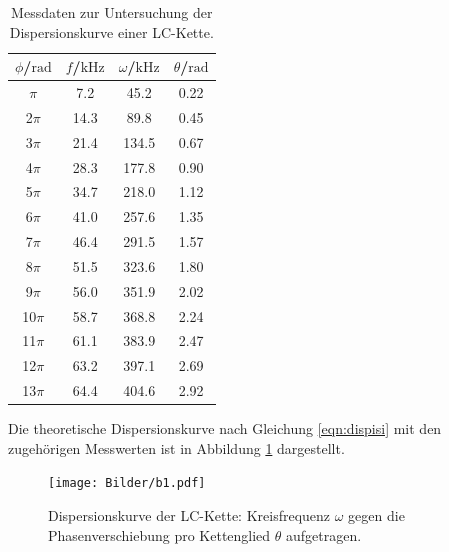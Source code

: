 \begin{table}
	\caption{Messdaten zur Untersuchung der Dispersionskurve einer LC-Kette.}
	\label{tab:dispersionlc}
	\centering
	\begin{tabular}{cccc}
		\toprule
		$\phi$/$\si{\radian}$ & $f$/$\si{\kilo\Hz}$ & $\omega$/$\si{\kilo\Hz}$ & $\theta$/$\si{\radian}$ \\
		\midrule
		$\pi$                 & 7.2                 & 45.2                     & 0.22                    \\
		2$\pi$                & 14.3                & 89.8                     & 0.45                    \\
		3$\pi$                & 21.4                & 134.5                    & 0.67                    \\
		4$\pi$                & 28.3                & 177.8                    & 0.90                    \\
		5$\pi$                & 34.7                & 218.0                    & 1.12                    \\
		6$\pi$                & 41.0                & 257.6                    & 1.35                    \\
		7$\pi$                & 46.4                & 291.5                    & 1.57                    \\
		8$\pi$                & 51.5                & 323.6                    & 1.80                    \\
		9$\pi$                & 56.0                & 351.9                    & 2.02                    \\
		10$\pi$               & 58.7                & 368.8                    & 2.24                    \\
		11$\pi$               & 61.1                & 383.9                    & 2.47                    \\
		12$\pi$               & 63.2                & 397.1                    & 2.69                    \\
		13$\pi$               & 64.4                & 404.6                    & 2.92                    \\
		\bottomrule
	\end{tabular}
\end{table}

Die theoretische Dispersionskurve nach Gleichung \eqref{eqn:dispisi} mit den zugehörigen
Messwerten ist in Abbildung \ref{fig:dispilc} dargestellt.

\begin{figure}
	\centering
	\texttt{[image: Bilder/b1.pdf]}
	\caption{Dispersionskurve der LC-Kette: Kreisfrequenz $\omega$ gegen die Phasenverschiebung pro Kettenglied $\theta$ aufgetragen.}
	\label{fig:dispilc}
\end{figure}

